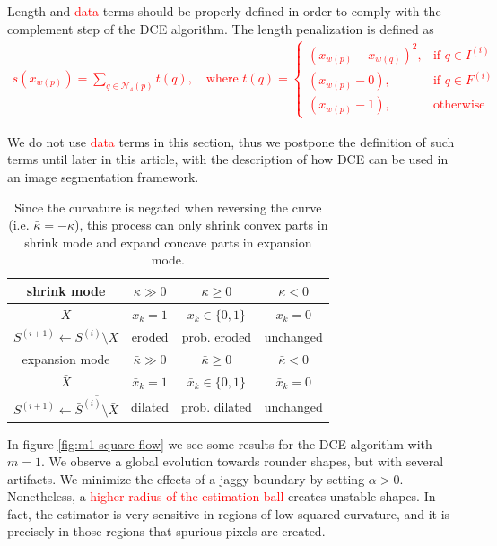 \documentclass[smallextended]{svjour3}       %
\newcommand{\revision}[1]{\textcolor{red}{#1}}
\begin{document}
Length and \revision{data} terms should be properly defined in order to comply with the complement step of the DCE
algorithm. The length penalization is defined as
\revision{
\begin{align}
  s(x_{w(p)})=\sum_{q \in \mathcal{N}_4(p)}{ t(q) }, \quad \text{where } t(q) = \left\{\begin{array}{ll}
  (x_{w(p)}-x_{w(q)})^2, & \text{if } q \in I^{(i)}\\
  (x_{w(p)}-0), & \text{if } q \in F^{(i)}\\
  (x_{w(p)}-1), & \text{otherwise }
  \end{array}\right.
  \label{eq:length-penalization}
\end{align}}
	
We do not use \revision{data} terms in this section, thus we postpone the definition of such terms until later in this
article, with the description of how DCE can be used in an image segmentation framework.



\begin{table}
  \center
  \setlength{\extrarowheight}{0.5em}
  \begin{tabular}{|c|c|c|c|} \hline
    shrink mode &    $\kappa \gg 0$ & $\kappa \geq 0$ &  $\kappa < 0$ \\ \hline
    $X$ & $x_k=1$ & $x_k \in \{0,1\}$ & $x_k=0$ \\ \hline
    $S^{(i+1)} \leftarrow S^{(i)} \setminus X$ & eroded & prob. eroded & unchanged  \\ \hline \hline
    expansion mode &    $\bar{\kappa} \gg 0$ & $\bar{\kappa} \geq 0$ & $\bar{\kappa} < 0$ \\ \hline
    $\bar{X}$ & $\bar{x}_k=1$ & $\bar{x}_k \in \{0,1\}$ & $\bar{x}_k=0$ \\ \hline
    $S^{(i+1)} \leftarrow \overline{\bar{S}^{(i)} \setminus \bar{X}}$ & dilated & prob. dilated & unchanged \\ \hline 
  \end{tabular}
  
  \caption{  Since the curvature is negated when reversing the curve (i.e. $\bar{\kappa}=-\kappa$), this process can only shrink  convex parts in shrink mode and expand concave parts in expansion mode.}
   \label{tab:flow-summary}	  

\end{table}


In figure \ref{fig:m1-square-flow} we see some results for the DCE algorithm with $m=1$. We observe a global evolution
towards rounder shapes, but with several artifacts. We minimize the effects of a jaggy boundary by setting $\alpha >
0$. Nonetheless, a \revision{higher radius of the estimation ball} creates unstable shapes. In fact, the estimator is very sensitive in
regions of low squared curvature, and it is precisely in those regions that spurious pixels are created.
\end{document}
